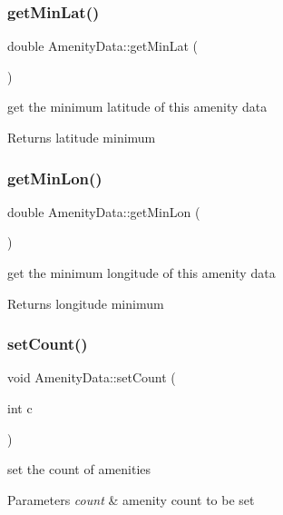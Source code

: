 \subsubsection{\texorpdfstring{get\+Min\+Lat()}{getMinLat()}}
{\footnotesize\ttfamily double Amenity\+Data\+::get\+Min\+Lat (\begin{DoxyParamCaption}{ }\end{DoxyParamCaption})\hspace{0.3cm}{\ttfamily [inline]}}

get the minimum latitude of this amenity data \begin{DoxyReturn}{Returns}
latitude minimum 
\end{DoxyReturn}
\mbox{\label{class_amenity_data_ad2ce802524f9da99438d12e4dc7378d5}} 
\subsubsection{\texorpdfstring{get\+Min\+Lon()}{getMinLon()}}
{\footnotesize\ttfamily double Amenity\+Data\+::get\+Min\+Lon (\begin{DoxyParamCaption}{ }\end{DoxyParamCaption})\hspace{0.3cm}{\ttfamily [inline]}}

get the minimum longitude of this amenity data \begin{DoxyReturn}{Returns}
longitude minimum 
\end{DoxyReturn}
\mbox{\label{class_amenity_data_af38edfbab9c7fd465fe8fd4e1aae50c8}} 
\subsubsection{\texorpdfstring{set\+Count()}{setCount()}}
{\footnotesize\ttfamily void Amenity\+Data\+::set\+Count (\begin{DoxyParamCaption}\item[{int}]{c }\end{DoxyParamCaption})\hspace{0.3cm}{\ttfamily [inline]}}

set the count of amenities 
\begin{DoxyParams}{Parameters}
{\em count} & amenity count to be set \\
\hline
\end{DoxyParams}
\mbox{\label{class_amenity_data_a296fe3b55d370c3281d08d9b2c9f2c42}} 
